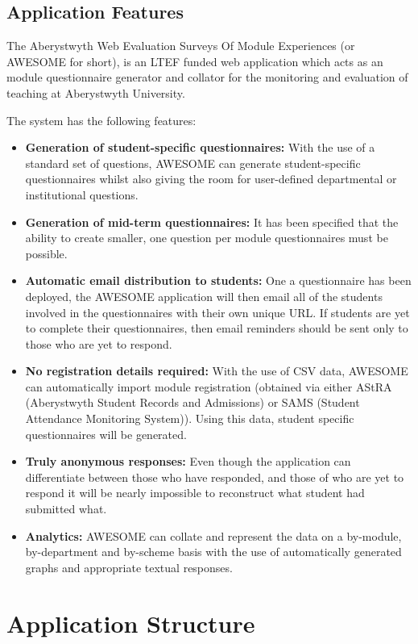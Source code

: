\documentclass[11pt,a4paper]{article}
\begin{document}
\subsection{Application Features}

The Aberystwyth Web Evaluation Surveys Of Module Experiences (or AWESOME for short), is an LTEF funded web application which acts as an module questionnaire generator and collator for the monitoring and evaluation of teaching at Aberystwyth University.

The system has the following features:

\begin{itemize}
	\item \textbf{Generation of student-specific questionnaires:} With the use of a standard set of questions, AWESOME can generate student-specific questionnaires whilst also giving the room for user-defined departmental or institutional questions.
	\item\textbf{Generation of mid-term questionnaires:} It has been specified that the ability to create smaller, one question per module questionnaires must be possible.
	\item \textbf{Automatic email distribution to students:} One a questionnaire has been deployed, the AWESOME application will then email all of the students involved in the questionnaires with their own unique URL. If students are yet to complete their questionnaires, then email reminders should be sent only to those who are yet to respond.
	\item \textbf{No registration details required:} With the use of CSV data, AWESOME can automatically import module registration (obtained via  either AStRA (Aberystwyth Student Records and Admissions) or SAMS (Student Attendance Monitoring System)). Using this data, student specific questionnaires will be generated.
	\item \textbf{Truly anonymous responses:} Even though the application can differentiate between those who have responded, and those of who are yet to respond it will be nearly impossible to reconstruct what student had submitted what.
	\item \textbf{Analytics:} AWESOME can collate and represent the data on a by-module, by-department and by-scheme basis with the use of automatically generated graphs and appropriate textual responses.
\end{itemize}

\clearpage

\section{Application Structure}
\end{document}

